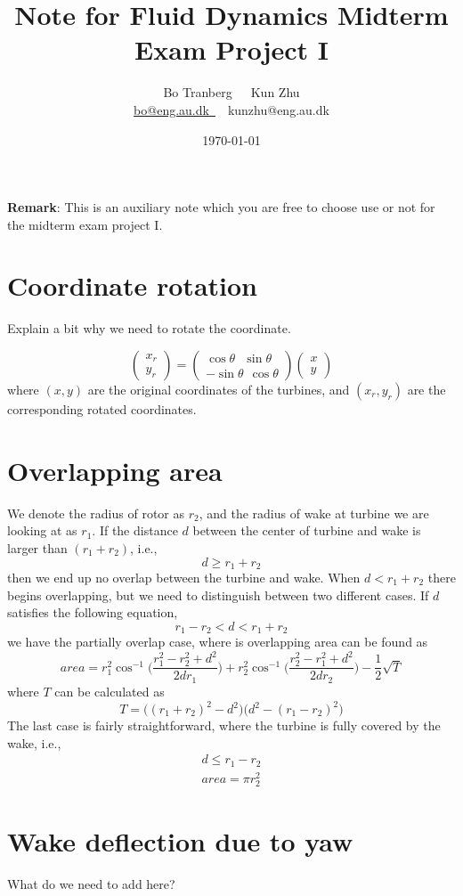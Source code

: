 \documentclass[a4paper, 11pt]{article}
\title{Note for Fluid Dynamics Midterm Exam Project I}
\author{Bo Tranberg\ \ \ Kun Zhu \\\href{mailto:bo@eng.au.dk}{bo@eng.au.dk}\href{mailto:kunzhu@eng.au.dk}\ \ \ {kunzhu@eng.au.dk}}
\date{\today}
\begin{document}
\maketitle

\large{
	\textbf{Remark}: This is an auxiliary note which you are free to choose use or not for the midterm exam project I. 
	}

\section{Coordinate rotation}
\begin{framed}
	Explain a bit why we need to rotate the coordinate.
\end{framed}
\begin{equation}
	\begin{pmatrix}
	x_r \\
	y_r
	\end{pmatrix}
	=
	\begin{pmatrix}
	\cos \theta \ \ \  \sin \theta\\
	-\sin \theta \ \ \cos \theta
	\end{pmatrix}
	\begin{pmatrix}
	x \\
	y
	\end{pmatrix}
\end{equation}
where $(x,y)$ are the original coordinates of the turbines, and $(x_r,y_r)$ are the corresponding rotated coordinates.
\section{Overlapping area}
We denote the radius of rotor as $r_2$, and the radius of wake at turbine we are looking at as $r_1$. If the distance $d$ between the center of turbine and wake is larger than $(r_1+r_2)$, i.e.,
\begin{equation}
d \geq r_1+r_2
\end{equation}
then we end up no overlap between the turbine and wake. When $d < r_1+r_2$ there begins overlapping, but we need to distinguish between two different cases. If $d$ satisfies the following equation, 
\begin{equation}
r_1-r_2 < d < r_1+r_2
\end{equation}
we have the partially overlap case, where is overlapping area can be found as
\begin{equation}
area = r^2_1 \cos^{-1}\bigg(\frac{r^2_1-r^2_2+d^2}{2dr_1}\bigg)
      +r^2_2 \cos^{-1}\bigg(\frac{r^2_2-r^2_1+d^2}{2dr_2}\bigg)
      -\frac{1}{2}\sqrt{T}
\end{equation}
where $T$ can be calculated as 
\begin{equation}
T = \Big((r_1+r_2)^2-d^2\Big)\Big(d^2-(r_1-r_2)^2 \Big)
\end{equation}
The last case is fairly straightforward, where the turbine is fully covered by the wake, i.e.,
\begin{equation}
	\begin{aligned}
	d \leq r_1-r_2 \\
	area = \pi r^2_2
	\end{aligned}
\end{equation}

\section{Wake deflection due to yaw}
\begin{framed}
	What do we need to add here?
\end{framed}
\end{document}
